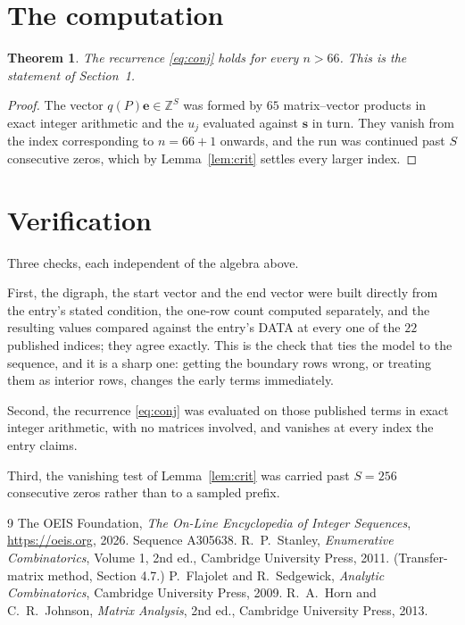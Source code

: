 \documentclass[11pt,a4paper]{article}
\theoremstyle{plain}
\newtheorem{theorem}{Theorem}
\theoremstyle{definition}
\begin{document}
\section{The computation}

\begin{theorem}
The recurrence \eqref{eq:conj} holds for every $n>66$. This is the statement of
Section~1.
\end{theorem}

\begin{proof}
The vector $q(P)\mathbf{e}\in\mathbb{Z}^{S}$ was formed by $65$ matrix--vector
products in exact integer arithmetic and the $u_j$ evaluated against $\mathbf{s}$ in turn.
They vanish from the index corresponding to $n=66+1$ onwards, and the run was continued
past $S$ consecutive zeros, which by Lemma~\ref{lem:crit} settles every larger index.
\end{proof}

\section{Verification}

Three checks, each independent of the algebra above.

First, the digraph, the start vector and the end vector were built directly from the
entry's stated condition, the one-row count computed separately, and the resulting values
compared against the entry's DATA at every one of the $22$ published indices; they
agree exactly. This is the check that ties the model to the sequence, and it is a sharp one:
getting the boundary rows wrong, or treating them as interior rows, changes the early terms
immediately.

Second, the recurrence \eqref{eq:conj} was evaluated on those published terms in exact
integer arithmetic, with no matrices involved, and vanishes at every index the entry claims.

Third, the vanishing test of Lemma~\ref{lem:crit} was carried past $S=256$ consecutive
zeros rather than to a sampled prefix.

\begin{thebibliography}{9}
 The OEIS Foundation, \emph{The On-Line Encyclopedia of Integer
Sequences}, \url{https://oeis.org}, 2026. Sequence A305638.
 R.~P.~Stanley, \emph{Enumerative Combinatorics}, Volume 1, 2nd ed.,
Cambridge University Press, 2011. (Transfer-matrix method, Section 4.7.)
 P.~Flajolet and R.~Sedgewick, \emph{Analytic Combinatorics}, Cambridge
University Press, 2009.
 R.~A.~Horn and C.~R.~Johnson, \emph{Matrix Analysis}, 2nd ed., Cambridge
University Press, 2013.
\end{thebibliography}
\end{document}
